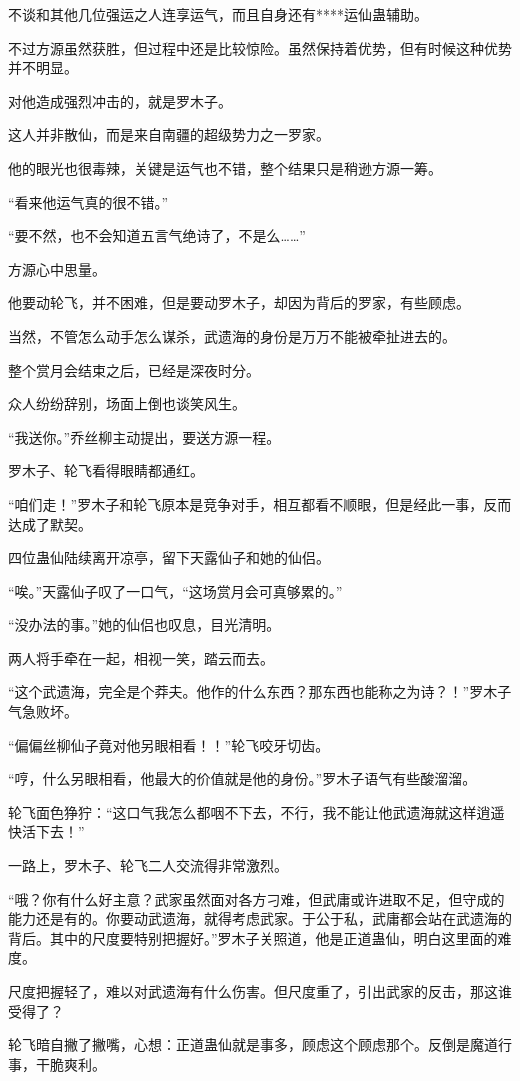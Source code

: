 \begin{this_body}
不谈和其他几位强运之人连享运气，而且自身还有****运仙蛊辅助。

不过方源虽然获胜，但过程中还是比较惊险。虽然保持着优势，但有时候这种优势并不明显。

对他造成强烈冲击的，就是罗木子。

这人并非散仙，而是来自南疆的超级势力之一罗家。

他的眼光也很毒辣，关键是运气也不错，整个结果只是稍逊方源一筹。

“看来他运气真的很不错。”

“要不然，也不会知道五言气绝诗了，不是么……”

方源心中思量。

他要动轮飞，并不困难，但是要动罗木子，却因为背后的罗家，有些顾虑。

当然，不管怎么动手怎么谋杀，武遗海的身份是万万不能被牵扯进去的。

整个赏月会结束之后，已经是深夜时分。

众人纷纷辞别，场面上倒也谈笑风生。

“我送你。”乔丝柳主动提出，要送方源一程。

罗木子、轮飞看得眼睛都通红。

“咱们走！”罗木子和轮飞原本是竞争对手，相互都看不顺眼，但是经此一事，反而达成了默契。

四位蛊仙陆续离开凉亭，留下天露仙子和她的仙侣。

“唉。”天露仙子叹了一口气，“这场赏月会可真够累的。”

“没办法的事。”她的仙侣也叹息，目光清明。

两人将手牵在一起，相视一笑，踏云而去。

“这个武遗海，完全是个莽夫。他作的什么东西？那东西也能称之为诗？！”罗木子气急败坏。

“偏偏丝柳仙子竟对他另眼相看！！”轮飞咬牙切齿。

“哼，什么另眼相看，他最大的价值就是他的身份。”罗木子语气有些酸溜溜。

轮飞面色狰狞：“这口气我怎么都咽不下去，不行，我不能让他武遗海就这样逍遥快活下去！”

一路上，罗木子、轮飞二人交流得非常激烈。

“哦？你有什么好主意？武家虽然面对各方刁难，但武庸或许进取不足，但守成的能力还是有的。你要动武遗海，就得考虑武家。于公于私，武庸都会站在武遗海的背后。其中的尺度要特别把握好。”罗木子关照道，他是正道蛊仙，明白这里面的难度。

尺度把握轻了，难以对武遗海有什么伤害。但尺度重了，引出武家的反击，那这谁受得了？

轮飞暗自撇了撇嘴，心想：正道蛊仙就是事多，顾虑这个顾虑那个。反倒是魔道行事，干脆爽利。


\end{this_body}
